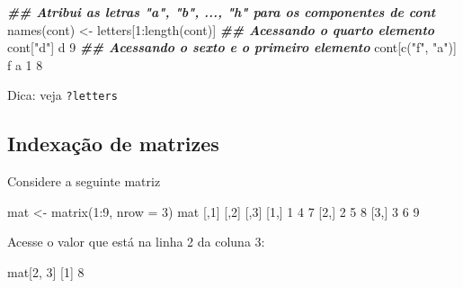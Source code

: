 \documentclass[
  10pt,
  a4paper]{book}
\newenvironment{Shaded}{\begin{snugshade}}{\end{snugshade}}
\newcommand{\AttributeTok}[1]{\textcolor[rgb]{0.77,0.63,0.00}{#1}}
\newcommand{\DecValTok}[1]{\textcolor[rgb]{0.00,0.00,0.81}{#1}}
\newcommand{\DocumentationTok}[1]{\textcolor[rgb]{0.56,0.35,0.01}{\textbf{\textit{#1}}}}
\newcommand{\FunctionTok}[1]{\textcolor[rgb]{0.00,0.00,0.00}{#1}}
\newcommand{\NormalTok}[1]{#1}
\newcommand{\OtherTok}[1]{\textcolor[rgb]{0.56,0.35,0.01}{#1}}
\newcommand{\SpecialCharTok}[1]{\textcolor[rgb]{0.00,0.00,0.00}{#1}}
\newcommand{\StringTok}[1]{\textcolor[rgb]{0.31,0.60,0.02}{#1}}
\begin{document}
\begin{Shaded}
\begin{Highlighting}[]
\DocumentationTok{\#\# Atribui as letras "a", "b", ..., "h" para os componentes de cont}
\FunctionTok{names}\NormalTok{(cont) }\OtherTok{\textless{}{-}}\NormalTok{ letters[}\DecValTok{1}\SpecialCharTok{:}\FunctionTok{length}\NormalTok{(cont)]}
\DocumentationTok{\#\# Acessando o quarto elemento}
\NormalTok{cont[}\StringTok{"d"}\NormalTok{]}
\NormalTok{d }
\DecValTok{9} 
\DocumentationTok{\#\# Acessando o sexto e o primeiro elemento}
\NormalTok{cont[}\FunctionTok{c}\NormalTok{(}\StringTok{"f"}\NormalTok{, }\StringTok{"a"}\NormalTok{)]}
\NormalTok{f a }
\DecValTok{1} \DecValTok{8} 
\end{Highlighting}
\end{Shaded}

Dica: veja \texttt{?letters}

\hypertarget{indexauxe7uxe3o-de-matrizes}{%
\subsection{Indexação de matrizes}\label{indexauxe7uxe3o-de-matrizes}}

Considere a seguinte matriz

\begin{Shaded}
\begin{Highlighting}[]
\NormalTok{mat }\OtherTok{\textless{}{-}} \FunctionTok{matrix}\NormalTok{(}\DecValTok{1}\SpecialCharTok{:}\DecValTok{9}\NormalTok{, }\AttributeTok{nrow =} \DecValTok{3}\NormalTok{)}
\NormalTok{mat}
\NormalTok{     [,}\DecValTok{1}\NormalTok{] [,}\DecValTok{2}\NormalTok{] [,}\DecValTok{3}\NormalTok{]}
\NormalTok{[}\DecValTok{1}\NormalTok{,]    }\DecValTok{1}    \DecValTok{4}    \DecValTok{7}
\NormalTok{[}\DecValTok{2}\NormalTok{,]    }\DecValTok{2}    \DecValTok{5}    \DecValTok{8}
\NormalTok{[}\DecValTok{3}\NormalTok{,]    }\DecValTok{3}    \DecValTok{6}    \DecValTok{9}
\end{Highlighting}
\end{Shaded}

Acesse o valor que está na linha 2 da coluna 3:

\begin{Shaded}
\begin{Highlighting}[]
\NormalTok{mat[}\DecValTok{2}\NormalTok{, }\DecValTok{3}\NormalTok{]}
\NormalTok{[}\DecValTok{1}\NormalTok{] }\DecValTok{8}
\end{Highlighting}
\end{Shaded}
\end{document}
